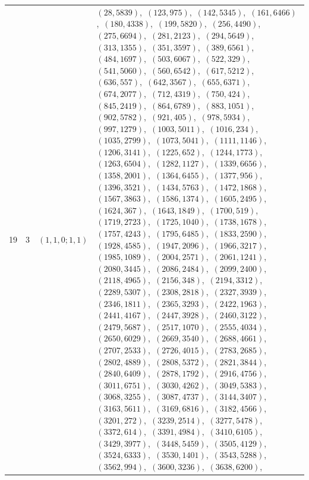 \documentclass[11pt]{article}
\begin{document}
\begin{longtable}{@{}rrl>{\raggedright\arraybackslash}p{}@{}}
19 & 3 & $(1,1,0;1,1)$ & $(28,5839)$,\allowbreak\ $(123,975)$,\allowbreak\ $(142,5345)$,\allowbreak\ $(161,6466)$,\allowbreak\ $(180,4338)$,\allowbreak\ $(199,5820)$,\allowbreak\ $(256,4490)$,\allowbreak\ $(275,6694)$,\allowbreak\ $(281,2123)$,\allowbreak\ $(294,5649)$,\allowbreak\ $(313,1355)$,\allowbreak\ $(351,3597)$,\allowbreak\ $(389,6561)$,\allowbreak\ $(484,1697)$,\allowbreak\ $(503,6067)$,\allowbreak\ $(522,329)$,\allowbreak\ $(541,5060)$,\allowbreak\ $(560,6542)$,\allowbreak\ $(617,5212)$,\allowbreak\ $(636,557)$,\allowbreak\ $(642,3567)$,\allowbreak\ $(655,6371)$,\allowbreak\ $(674,2077)$,\allowbreak\ $(712,4319)$,\allowbreak\ $(750,424)$,\allowbreak\ $(845,2419)$,\allowbreak\ $(864,6789)$,\allowbreak\ $(883,1051)$,\allowbreak\ $(902,5782)$,\allowbreak\ $(921,405)$,\allowbreak\ $(978,5934)$,\allowbreak\ $(997,1279)$,\allowbreak\ $(1003,5011)$,\allowbreak\ $(1016,234)$,\allowbreak\ $(1035,2799)$,\allowbreak\ $(1073,5041)$,\allowbreak\ $(1111,1146)$,\allowbreak\ $(1206,3141)$,\allowbreak\ $(1225,652)$,\allowbreak\ $(1244,1773)$,\allowbreak\ $(1263,6504)$,\allowbreak\ $(1282,1127)$,\allowbreak\ $(1339,6656)$,\allowbreak\ $(1358,2001)$,\allowbreak\ $(1364,6455)$,\allowbreak\ $(1377,956)$,\allowbreak\ $(1396,3521)$,\allowbreak\ $(1434,5763)$,\allowbreak\ $(1472,1868)$,\allowbreak\ $(1567,3863)$,\allowbreak\ $(1586,1374)$,\allowbreak\ $(1605,2495)$,\allowbreak\ $(1624,367)$,\allowbreak\ $(1643,1849)$,\allowbreak\ $(1700,519)$,\allowbreak\ $(1719,2723)$,\allowbreak\ $(1725,1040)$,\allowbreak\ $(1738,1678)$,\allowbreak\ $(1757,4243)$,\allowbreak\ $(1795,6485)$,\allowbreak\ $(1833,2590)$,\allowbreak\ $(1928,4585)$,\allowbreak\ $(1947,2096)$,\allowbreak\ $(1966,3217)$,\allowbreak\ $(1985,1089)$,\allowbreak\ $(2004,2571)$,\allowbreak\ $(2061,1241)$,\allowbreak\ $(2080,3445)$,\allowbreak\ $(2086,2484)$,\allowbreak\ $(2099,2400)$,\allowbreak\ $(2118,4965)$,\allowbreak\ $(2156,348)$,\allowbreak\ $(2194,3312)$,\allowbreak\ $(2289,5307)$,\allowbreak\ $(2308,2818)$,\allowbreak\ $(2327,3939)$,\allowbreak\ $(2346,1811)$,\allowbreak\ $(2365,3293)$,\allowbreak\ $(2422,1963)$,\allowbreak\ $(2441,4167)$,\allowbreak\ $(2447,3928)$,\allowbreak\ $(2460,3122)$,\allowbreak\ $(2479,5687)$,\allowbreak\ $(2517,1070)$,\allowbreak\ $(2555,4034)$,\allowbreak\ $(2650,6029)$,\allowbreak\ $(2669,3540)$,\allowbreak\ $(2688,4661)$,\allowbreak\ $(2707,2533)$,\allowbreak\ $(2726,4015)$,\allowbreak\ $(2783,2685)$,\allowbreak\ $(2802,4889)$,\allowbreak\ $(2808,5372)$,\allowbreak\ $(2821,3844)$,\allowbreak\ $(2840,6409)$,\allowbreak\ $(2878,1792)$,\allowbreak\ $(2916,4756)$,\allowbreak\ $(3011,6751)$,\allowbreak\ $(3030,4262)$,\allowbreak\ $(3049,5383)$,\allowbreak\ $(3068,3255)$,\allowbreak\ $(3087,4737)$,\allowbreak\ $(3144,3407)$,\allowbreak\ $(3163,5611)$,\allowbreak\ $(3169,6816)$,\allowbreak\ $(3182,4566)$,\allowbreak\ $(3201,272)$,\allowbreak\ $(3239,2514)$,\allowbreak\ $(3277,5478)$,\allowbreak\ $(3372,614)$,\allowbreak\ $(3391,4984)$,\allowbreak\ $(3410,6105)$,\allowbreak\ $(3429,3977)$,\allowbreak\ $(3448,5459)$,\allowbreak\ $(3505,4129)$,\allowbreak\ $(3524,6333)$,\allowbreak\ $(3530,1401)$,\allowbreak\ $(3543,5288)$,\allowbreak\ $(3562,994)$,\allowbreak\ $(3600,3236)$,\allowbreak\ $(3638,6200)$,\allowbreak\ 
\end{longtable}
\end{document}
